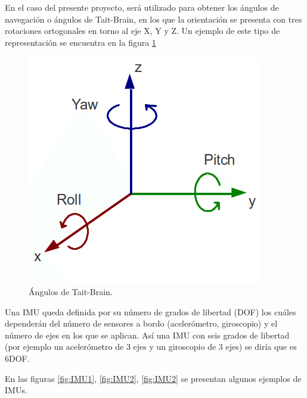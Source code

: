 En el caso del presente proyecto, será utilizado para obtener los ángulos de navegación o ángulos de Tait-Brain, en los que la orientación se presenta con tres rotaciones ortogonales en torno al eje X, Y y Z. Un ejemplo de este tipo de representación se encuentra en la figura \ref{fig:orientacion}\newline


	\begin{figure}[H]
	\center
	\includegraphics[scale=0.5]{imagenes/Balancing_robot/orientacion}
	\caption{Ángulos de Tait-Brain.}
	\label{fig:orientacion}
\end{figure}


Una IMU queda definida por su número de grados de libertad (DOF) los cuáles dependerán del número de sensores a bordo (acelerómetro, giroscopio) y el número de ejes en los que se aplican. Así una IMU con seis grados de libertad (por ejemplo un acelerómetro de 3 ejes y un giroscopio de 3 ejes) se diría que es 6DOF. \newline

En las figuras \ref{fig:IMU1}, \ref{fig:IMU2}, \ref{fig:IMU2} se presentan algunos ejemplos de IMUs.

